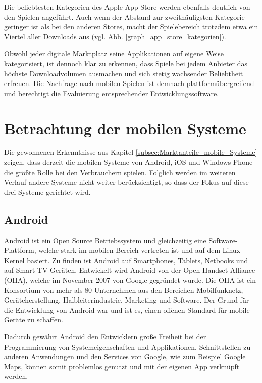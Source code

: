 Die beliebtesten Kategorien des Apple App Store werden ebenfalls deutlich von den Spielen angeführt. Auch wenn der Abstand zur zweithäufigsten Kategorie geringer ist als bei den anderen Stores, macht der Spielebereich trotzdem etwa ein Viertel aller Downloads aus (vgl. Abb. \ref{graph_app_store_kategorien}).

\bigskip
Obwohl jeder digitale Marktplatz seine Applikationen auf eigene Weise kategorisiert, ist dennoch klar zu erkennen, dass Spiele bei jedem Anbieter das höchste Downloadvolumen ausmachen und sich stetig wachsender Beliebtheit erfreuen. Die Nachfrage nach mobilen Spielen ist demnach plattformübergreifend und berechtigt die Evaluierung entsprechender Entwicklungssoftware.

\section{Betrachtung der mobilen Systeme}
Die gewonnenen Erkenntnisse aus Kapitel \ref{subsec:Marktanteile_mobile_Systeme} zeigen, dass derzeit die mobilen Systeme von Android, iOS und Windows Phone die größte Rolle bei den Verbrauchern spielen. Folglich werden im weiteren Verlauf andere Systeme nicht weiter berücksichtigt, so dass der Fokus auf diese drei Systeme gerichtet wird.

\subsection{Android}
Android ist ein Open Source Betriebssystem und gleichzeitig eine Software-Plattform, welche stark im mobilen Bereich vertreten ist und auf dem Linux-Kernel basiert. Zu finden ist Android auf Smartphones, Tablets, Netbooks und auf Smart-TV Geräten. \citep{android_overview} Entwickelt wird Android von der Open Handset Alliance (OHA), welche im November 2007 von Google gegründet wurde. Die OHA ist ein Konsortium von mehr als 80 Unternehmen aus den Bereichen Mobilfunknetz, Geräteherstellung, Halbleiterindustrie, Marketing und Software. \citep{alliance_members} Der Grund für die Entwicklung von Android war und ist es, einen offenen Standard für mobile Geräte zu schaffen. \citep{alliance_overview}

Dadurch gewährt Android den Entwicklern große Freiheit bei der Programmierung von Systemeigenschaften und Applikationen. Schnittstellen zu anderen Anwendungen und den Services von Google, wie zum Beispiel Google Maps, können somit problemlos genutzt und mit der eigenen App verknüpft werden.

